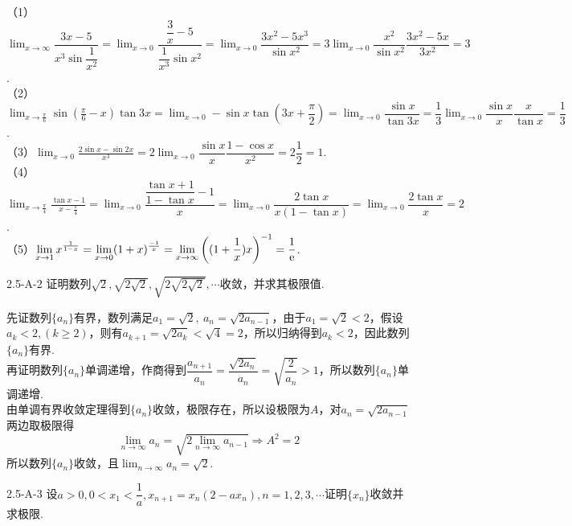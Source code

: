 \begin{solution}
    （1）$\displaystyle\lim_{x\to\infty}\dfrac{3x-5}{x^3\sin\dfrac{1}{x^2}}=\lim_{x\to 0}\dfrac{\dfrac{3}{x}-5}{\dfrac{1}{x^3}\sin x^2}=\lim_{x\to 0}\dfrac{3x^2-5x^3}{\sin x^2}=3\lim_{x\to 0}\dfrac{x^2}{\sin x^2}\dfrac{3x^2-5x}{3x^2}=3$.\\\vspace{0.5em}
    （2）$\displaystyle\lim _{x \rightarrow \frac{\pi}{6}} \sin \left(\frac{\pi}{6}-x\right) \tan 3 x=\lim _{x \rightarrow 0}-\sin x\tan(3x+\dfrac{\pi}{2})=\lim_{x\to 0}\dfrac{\sin x}{\tan 3x}=\dfrac13\lim_{x\to 0}\dfrac{\sin x}{x}\dfrac{x}{\tan x}=\dfrac13$.\\\vspace{0.5em}
    （3）$\displaystyle\lim _{x \rightarrow 0} \frac{2 \sin x-\sin 2 x}{x^{3}}=2\lim _{x \rightarrow 0}\dfrac{\sin x}{x}\dfrac{1-\cos x}{x^2}=2\dfrac12=1$.\\\vspace{0.5em}
    （4）$\displaystyle\lim _{x \rightarrow \frac{\pi}{4}} \frac{\tan x-1}{x-\frac{\pi}{4}}=\lim _{x \rightarrow 0}\dfrac{\dfrac{\tan x+1}{1-\tan x}-1}{x}=\lim _{x \rightarrow 0}\dfrac{2\tan x}{x(1-\tan x)}=\lim_{x\to 0}\dfrac{2\tan x}{x}=2$.\\\vspace{0.5em}
    （5）$\displaystyle\lim _{x \rightarrow 1} x^{\frac{1}{1-x}}=\lim _{x \rightarrow 0}(1+x)^{\frac{-1}{x}}=\lim_{x \rightarrow \infty}\bigg((1+\dfrac1x){x}\bigg)^{-1}=\dfrac{1}{\text{e}}$.
\end{solution}
\begin{example}{2.5-A-2}{}
    证明数列$\sqrt2,\sqrt{2\sqrt2},\sqrt{2\sqrt{2\sqrt2}},\cdots$收敛，并求其极限值.
\end{example}
\begin{solution}
    先证数列$\{a_n\}$有界，数列满足$a_1=\sqrt2,\ a_n=\sqrt{2a_{n-1}}$，由于$a_1=\sqrt2<2$，假设$a_k<2,(k\geq 2)$，则有$a_{k+1}=\sqrt{2a_k}<\sqrt4=2$，所以归纳得到$a_k<2$，因此数列$\{a_n\}$有界.\\
    再证明数列$\{a_n\}$单调递增，作商得到$\dfrac{a_{n+1}}{a_n}=\dfrac{\sqrt{2a_n}}{a_n}=\sqrt{\dfrac{2}{a_n}}>1$，所以数列$\{a_n\}$单调递增.\\
    由单调有界收敛定理得到$\{a_n\}$收敛，极限存在，所以设极限为$A$，对$a_n=\sqrt{2a_{n-1}}$两边取极限得
    \[\displaystyle\lim_{n\to\infty}a_n=\sqrt{2\lim_{n\to\infty}a_{n-1}}\Rightarrow A^2=2\]所以数列$\{a_n\}$收敛，且$\lim_{n\to\infty}a_n=\sqrt2$.
\end{solution}
\begin{example}{2.5-A-3}{}
    设$a>0,0<x_1<\dfrac1{a},x_{n+1}=x_n(2-ax_n),n=1,2,3,\cdots$证明$\{x_n\}$收敛并求极限.
\end{example}
